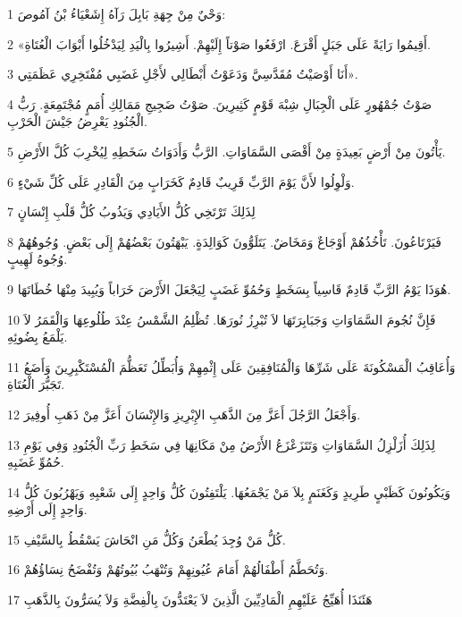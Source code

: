 \par 1 وَحْيٌ مِنْ جِهَةِ بَابِلَ رَآهُ إِشَعْيَاءُ بْنُ آمُوصَ:
\par 2 «أَقِيمُوا رَايَةً عَلَى جَبَلٍ أَقْرَعَ. ارْفَعُوا صَوْتاً إِلَيْهِمْ. أَشِيرُوا بِالْيَدِ لِيَدْخُلُوا أَبْوَابَ الْعُتَاةِ.
\par 3 أَنَا أَوْصَيْتُ مُقَدَّسِيَّ وَدَعَوْتُ أَبْطَالِي لأَجْلِ غَضَبِي مُفْتَخِرِي عَظَمَتِي».
\par 4 صَوْتُ جُمْهُورٍ عَلَى الْجِبَالِ شِبْهَ قَوْمٍ كَثِيرِينَ. صَوْتُ ضَجِيجِ مَمَالِكِ أُمَمٍ مُجْتَمِعَةٍ. رَبُّ الْجُنُودِ يَعْرِضُ جَيْشَ الْحَرْبِ.
\par 5 يَأْتُونَ مِنْ أَرْضٍ بَعِيدَةٍ مِنْ أَقْصَى السَّمَاوَاتِ. الرَّبُّ وَأَدَوَاتُ سَخَطِهِ لِيُخْرِبَ كُلَّ الأَرْضِ.
\par 6 وَلْوِلُوا لأَنَّ يَوْمَ الرَّبِّ قَرِيبٌ قَادِمٌ كَخَرَابٍ مِنَ الْقَادِرِ عَلَى كُلِّ شَيْءٍ.
\par 7 لِذَلِكَ تَرْتَخِي كُلُّ الأَيَادِي وَيَذُوبُ كُلُّ قَلْبِ إِنْسَانٍ
\par 8 فَيَرْتَاعُونَ. تَأْخُذُهُمْ أَوْجَاعٌ وَمَخَاضٌ. يَتَلَوُّونَ كَوَالِدَةٍ. يَبْهَتُونَ بَعْضُهُمْ إِلَى بَعْضٍ. وُجُوهُهُمْ وُجُوهُ لَهِيبٍ.
\par 9 هُوَذَا يَوْمُ الرَّبِّ قَادِمٌ قَاسِياً بِسَخَطٍ وَحُمُوِّ غَضَبٍ لِيَجْعَلَ الأَرْضَ خَرَاباً وَيُبِيدَ مِنْهَا خُطَاتَهَا.
\par 10 فَإِنَّ نُجُومَ السَّمَاوَاتِ وَجَبَابِرَتَهَا لاَ تُبْرِزُ نُورَهَا. تُظْلِمُ الشَّمْسُ عِنْدَ طُلُوعِهَا وَالْقَمَرُ لاَ يَلْمَعُ بِضُوئِهِ.
\par 11 وَأُعَاقِبُ الْمَسْكُونَةَ عَلَى شَرِّهَا وَالْمُنَافِقِينَ عَلَى إِثْمِهِمْ وَأُبَطِّلُ تَعَظُّمَ الْمُسْتَكْبِرِينَ وَأَضَعُ تَجَبُّرَ الْعُتَاةِ.
\par 12 وَأَجْعَلُ الرَّجُلَ أَعَزَّ مِنَ الذَّهَبِ الإِبْرِيزِ وَالإِنْسَانَ أَعَزَّ مِنْ ذَهَبِ أُوفِيرَ.
\par 13 لِذَلِكَ أُزَلْزِلُ السَّمَاوَاتِ وَتَتَزَعْزَعُ الأَرْضُ مِنْ مَكَانِهَا فِي سَخَطِ رَبِّ الْجُنُودِ وَفِي يَوْمِ حُمُوِّ غَضَبِهِ.
\par 14 وَيَكُونُونَ كَظَبْيٍ طَرِيدٍ وَكَغَنَمٍ بِلاَ مَنْ يَجْمَعُهَا. يَلْتَفِتُونَ كُلُّ وَاحِدٍ إِلَى شَعْبِهِ وَيَهْرُبُونَ كُلُّ وَاحِدٍ إِلَى أَرْضِهِ.
\par 15 كُلُّ مَنْ وُجِدَ يُطْعَنُ وَكُلُّ مَنِ انْحَاشَ يَسْقُطُ بِالسَّيْفِ.
\par 16 وَتُحَطَّمُ أَطْفَالُهُمْ أَمَامَ عُيُونِهِمْ وَتُنْهَبُ بُيُوتُهُمْ وَتُفْضَحُ نِسَاؤُهُمْ.
\par 17 هَئَنَذَا أُهَيِّجُ عَلَيْهِمِ الْمَادِيِّينَ الَّذِينَ لاَ يَعْتَدُّونَ بِالْفِضَّةِ وَلاَ يُسَرُّونَ بِالذَّهَبِ

